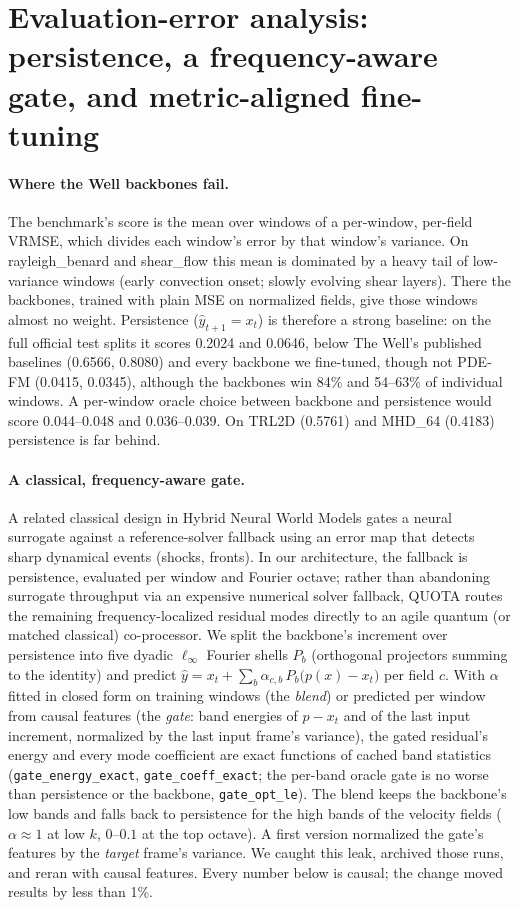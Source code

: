\documentclass{article}
\begin{document}
\section{Evaluation-error analysis: persistence, a frequency-aware gate, and metric-aligned fine-tuning}
\label{app:gate}

\paragraph{Where the Well backbones fail.} The benchmark's score is the mean over windows of a per-window, per-field
VRMSE, which divides each window's error by that window's variance. On rayleigh\_benard and shear\_flow this mean is
dominated by a heavy tail of low-variance windows (early convection onset; slowly evolving shear layers). There the
backbones, trained with plain MSE on normalized fields, give those windows almost no weight. Persistence
($\hat y_{t+1}=x_t$) is therefore a strong baseline: on the full official test splits it scores 0.2024 and 0.0646,
below The Well's published baselines (0.6566, 0.8080) and every backbone we fine-tuned, though not PDE-FM (0.0415, 0.0345), although the backbones win 84\% and
54--63\% of individual windows. A per-window oracle choice between backbone and persistence would score 0.044--0.048 and
0.036--0.039. On TRL2D (0.5761) and MHD\_64 (0.4183) persistence is far behind.

\paragraph{A classical, frequency-aware gate.} A related classical design in Hybrid Neural World Models
\citep{lakshmanan2026hnwm} gates a neural surrogate against a reference-solver fallback using an error map that detects
sharp dynamical events (shocks, fronts). In our architecture, the fallback is persistence, evaluated per window and
Fourier octave; rather than abandoning surrogate throughput via an expensive numerical solver fallback, QUOTA routes the
remaining frequency-localized residual modes directly to an agile quantum (or matched classical) co-processor. We split
the backbone's increment over persistence into five dyadic
$\ell_\infty$ Fourier shells $P_b$ (orthogonal projectors summing to the identity) and predict
$\hat y = x_t + \sum_b \alpha_{c,b}\,P_b\big(p(x) - x_t\big)$ per field $c$. With $\alpha$ fitted in closed form on
training windows (the \emph{blend}) or predicted per window from causal features (the \emph{gate}: band energies of
$p-x_t$ and of the last input increment, normalized by the last input frame's variance), the gated residual's energy
and every mode coefficient are exact functions of cached band statistics (\texttt{gate\_energy\_exact},
\texttt{gate\_coeff\_exact}; the per-band oracle gate is no worse than persistence or the backbone,
\texttt{gate\_opt\_le}). The blend keeps the backbone's low bands and falls back to persistence for the high bands of
the velocity fields ($\alpha\approx1$ at low $k$, $0$--$0.1$ at the top octave). A first version normalized the gate's
features by the \emph{target} frame's variance. We caught this leak, archived those runs, and reran with causal features.
Every number below is causal; the change moved results by less than 1\%.
\end{document}
